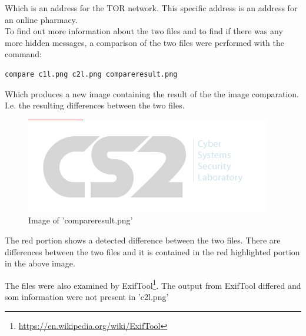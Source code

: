 \documentclass[a4paper,10pt,oneside]{article}
\begin{document}
Which is an address for the TOR network. This specific address is an address for an online pharmacy.\\

To find out more information about the two files and to find if there was any more hidden messages, a comparison of the two files were performed with the command:\\

\begin{lstlisting}
compare c1l.png c2l.png compareresult.png
\end{lstlisting}

Which produces a new image containing the result of the the image comparation. I.e. the resulting differences between the two files.

\begin{figure}[!ht]
	\includegraphics[width=\textwidth]{images/compareresult.png}
	\caption{Image of 'compareresult.png'}
	\centering
\end{figure}

The red portion shows a detected difference between the two files. There are differences between the two files and it is contained in the red highlighted portion in the above image.

\newpage
The files were also examined by ExifTool\footnote{\url{https://en.wikipedia.org/wiki/ExifTool}}. The output from
ExifTool differed and som information were not present in 'c2l.png'
\end{document}
